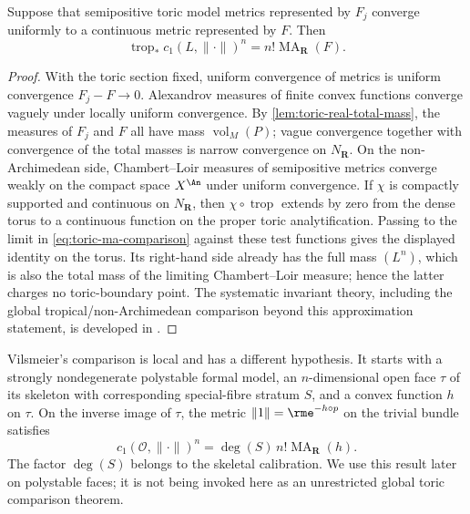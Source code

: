 \begin{corollary}\label{cor:toric-ma-continuous}
Suppose that semipositive toric model metrics represented by $F_j$ converge
uniformly to a continuous metric represented by $F$.  Then
\[
 \operatorname{trop}_*c_1(L,\|\cdot\|)^n
 =n!\operatorname{MA}_{\mathbf R}(F).
\]
\end{corollary}

\begin{proof}
With the toric section fixed, uniform convergence of metrics is uniform
convergence $F_j-F\to0$.  Alexandrov measures of finite convex functions
converge vaguely under locally uniform convergence.  By
\cref{lem:toric-real-total-mass}, the measures of $F_j$ and $F$ all have mass
$\operatorname{vol}_M(P)$; vague convergence together with convergence of
the total masses is narrow convergence on $N_{\mathbf R}$.  On the
non-Archimedean side, Chambert--Loir measures of semipositive metrics
converge weakly on the compact space $X^{\An}$ under uniform convergence.
If $\chi$ is compactly supported and continuous on $N_{\mathbf R}$, then
$\chi\circ\operatorname{trop}$ extends by zero from the dense torus to a
continuous function on the proper toric analytification.  Passing to the
limit in \eqref{eq:toric-ma-comparison} against these test functions gives
the displayed identity on the torus.  Its right-hand side already has the
full mass $(L^n)$, which is also the total mass of the limiting
Chambert--Loir measure; hence the latter charges no toric-boundary point.
The systematic invariant theory, including the global
tropical/non-Archimedean comparison beyond this approximation statement, is
developed in \cite{BGJKK25}.
\end{proof}

\begin{remark}
\label{rem:ch08-skeletal-comparison-scope}
Vilsmeier's comparison \cite[Corollary~5.10]{Vil20} is local and has a
different hypothesis.  It starts with a strongly nondegenerate polystable
formal model, an $n$-dimensional open face $\tau$ of its skeleton with
corresponding special-fibre stratum $S$, and a convex function $h$ on
$\tau$.  On the inverse image of $\tau$, the metric
$\|1\|=\rme^{-h\circ p}$ on the trivial bundle satisfies
\[
 c_1(\mathcal O,\|\cdot\|)^n
 =\deg(S)\,n!\operatorname{MA}_{\mathbf R}(h).
\]
The factor $\deg(S)$ belongs to the skeletal calibration.  We use this
result later on polystable faces; it is not being invoked here as an
unrestricted global toric comparison theorem.
\end{remark}

